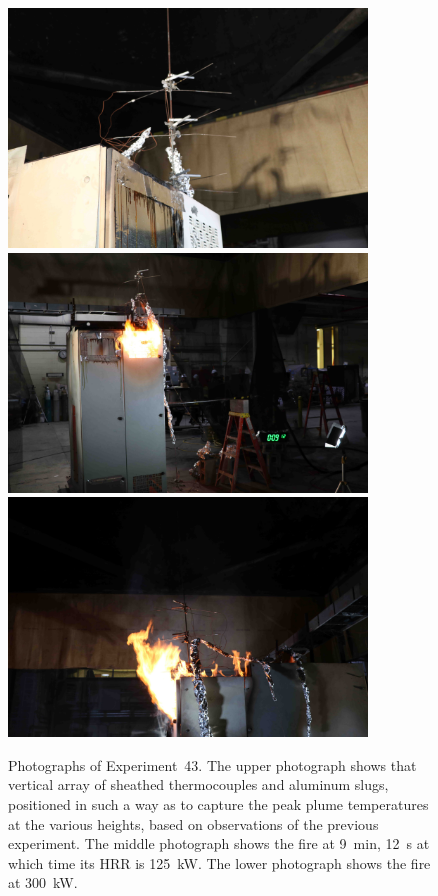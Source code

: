 \begin{figure}[p]
\centering
\includegraphics[height=2.50in]{../FIGURES/Test_43_setup} \\ \vspace{0.1in}
\includegraphics[height=2.50in]{../FIGURES/Test_43_9_min_12_s} \\ \vspace{0.1in}
\includegraphics[height=2.50in]{../FIGURES/Test_43_side}
\caption[Photographs of Experiment~43]{Photographs of Experiment~43. The upper photograph shows that vertical array of sheathed thermocouples and aluminum slugs, positioned in such a way as to capture the peak plume temperatures at the various heights, based on observations of the previous experiment. The middle photograph shows the fire at 9~min, 12~s at which time its HRR is 125~kW. The lower photograph shows the fire at 300~kW.}
\label{fig:Test_43_photos}
\end{figure}



